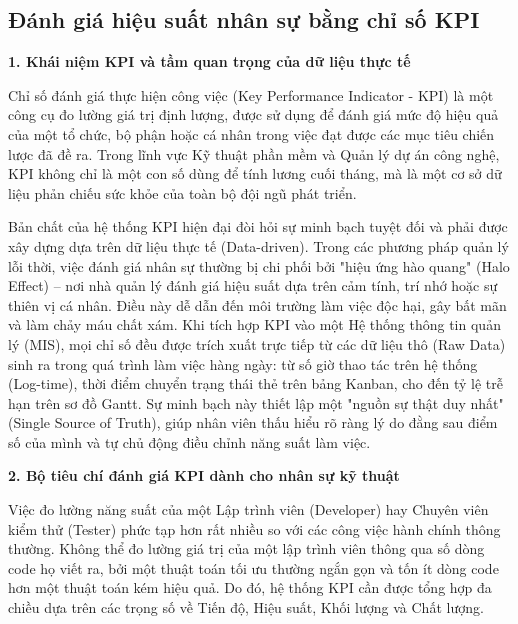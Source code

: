 \documentclass[a4paper,13.5pt]{extreport}
\begin{document}
\subsection{Đánh giá hiệu suất nhân sự bằng chỉ số KPI}

\textbf{1. Khái niệm KPI và tầm quan trọng của dữ liệu thực tế}

Chỉ số đánh giá thực hiện công việc (Key Performance Indicator - KPI) là một công cụ đo lường giá trị định lượng, được sử dụng để đánh giá mức độ hiệu quả của một tổ chức, bộ phận hoặc cá nhân trong việc đạt được các mục tiêu chiến lược đã đề ra. Trong lĩnh vực Kỹ thuật phần mềm và Quản lý dự án công nghệ, KPI không chỉ là một con số dùng để tính lương cuối tháng, mà là một cơ sở dữ liệu phản chiếu sức khỏe của toàn bộ đội ngũ phát triển.

Bản chất của hệ thống KPI hiện đại đòi hỏi sự minh bạch tuyệt đối và phải được xây dựng dựa trên dữ liệu thực tế (Data-driven). Trong các phương pháp quản lý lỗi thời, việc đánh giá nhân sự thường bị chi phối bởi "hiệu ứng hào quang" (Halo Effect) – nơi nhà quản lý đánh giá hiệu suất dựa trên cảm tính, trí nhớ hoặc sự thiên vị cá nhân. Điều này dễ dẫn đến môi trường làm việc độc hại, gây bất mãn và làm chảy máu chất xám. Khi tích hợp KPI vào một Hệ thống thông tin quản lý (MIS), mọi chỉ số đều được trích xuất trực tiếp từ các dữ liệu thô (Raw Data) sinh ra trong quá trình làm việc hàng ngày: từ số giờ thao tác trên hệ thống (Log-time), thời điểm chuyển trạng thái thẻ trên bảng Kanban, cho đến tỷ lệ trễ hạn trên sơ đồ Gantt. Sự minh bạch này thiết lập một "nguồn sự thật duy nhất" (Single Source of Truth), giúp nhân viên thấu hiểu rõ ràng lý do đằng sau điểm số của mình và tự chủ động điều chỉnh năng suất làm việc.

\textbf{2. Bộ tiêu chí đánh giá KPI dành cho nhân sự kỹ thuật}

Việc đo lường năng suất của một Lập trình viên (Developer) hay Chuyên viên kiểm thử (Tester) phức tạp hơn rất nhiều so với các công việc hành chính thông thường. Không thể đo lường giá trị của một lập trình viên thông qua số dòng code họ viết ra, bởi một thuật toán tối ưu thường ngắn gọn và tốn ít dòng code hơn một thuật toán kém hiệu quả. Do đó, hệ thống KPI cần được tổng hợp đa chiều dựa trên các trọng số về Tiến độ, Hiệu suất, Khối lượng và Chất lượng.
\end{document}
